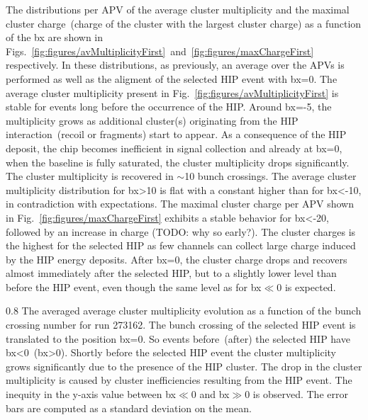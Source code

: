 The distributions per APV of the average cluster multiplicity and the maximal cluster charge~(charge of the cluster with the largest cluster charge) as a function of the bx are shown in Figs.~\ref{fig:figures/avMultiplicityFirst}~and~\ref{fig:figures/maxChargeFirst} respectively. In these distributions, as previously, an average over the APVs is performed as well as the aligment of the selected HIP event with bx=0. The average cluster multiplicity present in Fig.~\ref{fig:figures/avMultiplicityFirst} is stable for events long before the occurrence of the HIP. Around bx=-5, the multiplicity grows as additional cluster(s) originating from the HIP interaction~(recoil or fragments) start to appear. As a consequence of the HIP deposit, the chip becomes inefficient in signal collection and already at bx=0, when the baseline is fully saturated, the cluster multiplicity drops significantly. The cluster multiplicity is recovered in $\sim$10 bunch crossings. The average cluster multiplicity distribution for bx>10 is flat with a constant higher than for bx<-10, in contradiction with expectations. The maximal cluster charge per APV shown in Fig.~\ref{fig:figures/maxChargeFirst} exhibits a stable behavior for bx<-20, followed by an increase in charge (TODO: why so early?). The cluster charges is the highest for the selected HIP as few channels can collect large charge induced by the HIP energy deposits. After bx=0, the cluster charge drops and recovers almost immediately after the selected HIP, but to a slightly lower level than before the HIP event, even though the same level as for bx$\ll$0 is expected. 



                 {0.8}       %
                 {The averaged average cluster multiplicity evolution as a function of the bunch crossing number for run 273162. The bunch crossing of the selected HIP event is translated to the position bx=0. So events before~(after) the selected HIP have bx<0~(bx>0). Shortly before the selected HIP event the cluster multiplicity grows significantly due to the presence of the HIP cluster. The drop in the cluster multiplicity is caused by cluster inefficiencies resulting from the HIP event. The inequity in the y-axis value between bx$\ll$0 and bx$\gg$0 is observed. The error bars are computed as a standard deviation on the mean. } %

